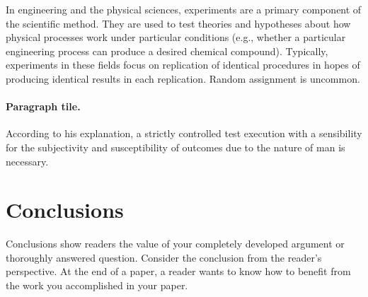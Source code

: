 \documentclass[11pt, a4paper]{article}
\begin{document}
In engineering and the physical sciences, experiments are a primary component of the scientific method. They are used to test theories and hypotheses about how physical processes work under particular conditions (e.g., whether a particular engineering process can produce a desired chemical compound). Typically, experiments in these fields focus on replication of identical procedures in hopes of producing identical results in each replication. Random assignment is uncommon. 

\paragraph{Paragraph tile.}
According to his explanation, a strictly controlled test execution with a sensibility for the subjectivity and susceptibility of outcomes due to the nature of man is necessary.

\section{Conclusions}\label{sec:conc} 
Conclusions show readers the value of your completely developed argument or thoroughly answered question. Consider the conclusion from the reader's perspective. At the end of a paper, a reader wants to know how to benefit from the work you accomplished in your paper. 


\small\singlespacing
 
 

\appendix

\end{document}
